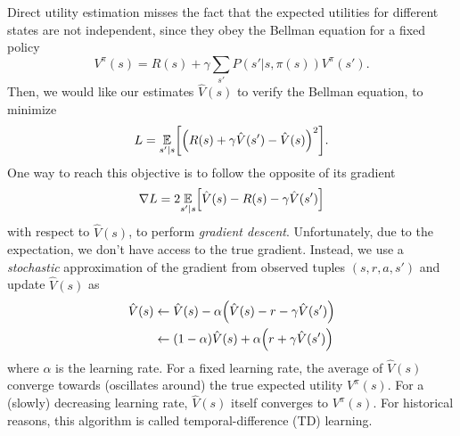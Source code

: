 \documentclass[11pt, a4paper]{article}
\begin{document}
\begin{enumerate}
    \begin{solution}
        Direct utility estimation misses the fact that the expected utilities for different states are not independent, since they obey the Bellman equation for a fixed policy
        \begin{equation*}
            V^\pi(s) = R(s) + \gamma \sum_{s'} P(s' | s, \pi(s)) V^\pi(s').
        \end{equation*}
        Then, we would like our estimates $\hat{V}(s)$ to verify the Bellman equation, \ie{} to minimize
        \begin{equation*}
            L = \underset{s' | s}{\E} \sbk*{\rbk*{R(s) + \gamma \hat{V}(s') - \hat{V}(s)}^2} .
        \end{equation*}
        One way to reach this objective is to follow the opposite of its gradient
        \begin{equation*}
            \nabla L = 2 \underset{s' | s}{\E} \sbk*{\hat{V}(s) - R(s) - \gamma \hat{V}(s')}
        \end{equation*}
        with respect to $\hat{V}(s)$, \ie{} to perform \emph{gradient descent}. Unfortunately, due to the expectation, we don't have access to the true gradient. Instead, we use a \emph{stochastic} approximation of the gradient from observed\footnotemark{} tuples $(s, r, a, s')$ and update $\hat{V}(s)$ as
        \begin{align*}
            \hat{V}(s) & \gets \hat{V}(s) - \alpha \rbk*{\hat{V}(s) - r - \gamma \hat{V}(s')} \\
            & \gets (1 - \alpha) \hat{V}(s) + \alpha \rbk*{r + \gamma \hat{V}(s')}
        \end{align*}
        where $\alpha$ is the learning rate. For a fixed learning rate, the average of $\hat{V}(s)$ converge towards (oscillates around) the true expected utility $V^\pi(s)$. For a (slowly) decreasing learning rate, $\hat{V}(s)$ itself converges to $V^\pi(s)$. For historical reasons, this algorithm is called temporal-difference (TD) learning.



\end{solution}
\end{enumerate}
\end{document}
